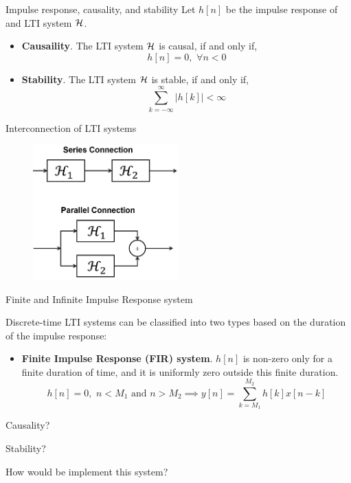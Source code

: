 \documentclass[aspectratio=169]{beamer}
\let\olditem\item
\renewcommand{\item}{\setlength{\itemsep}{\fill}\olditem}
\def\mc{\ensuremath\mathcal}
\begin{document}
\begin{frame}[t]{Impulse response, causality, and stability}
Let $h[n]$ be the impulse response of and LTI system $\mc{H}$. \vspace{0.5cm}

\begin{itemize}
  \item \textbf{Causaility}. The LTI system $\mc{H}$ is causal, if and only if,
  \[ h[n] = 0, \,\, \forall n < 0 \]
  \item \textbf{Stability}. The LTI system $\mc{H}$ is stable, if and only if,
  \[ \sum_{k=-\infty}^{\infty} \vert h[k] \vert < \infty \]
\end{itemize}
\end{frame}



\begin{frame}[t]{Interconnection of LTI systems}

\begin{figure}
\includegraphics[width=0.5\textwidth]{img/connections.png}
\end{figure}

\end{frame}

\begin{frame}[t]{Finite and Infinite Impulse Response system}

Discrete-time LTI systems can be classified into two types based on the duration of the impulse response:
\begin{itemize}
  \item \textbf{Finite Impulse Response (FIR) system}. $h[n]$ is non-zero only for a finite duration of time, and it is uniformly zero outside this finite duration.
  \[ h[n] = 0, \,\, n < M_1 \,\, \text{and} \,\, n > M_2 \implies y[n] = \sum_{k=M_1}^{M_2} h[k]x[n-k] \]
\end{itemize}

Causality? \vspace{0.5cm}

Stability?

How would be implement this system?

\end{frame}
\end{document}
